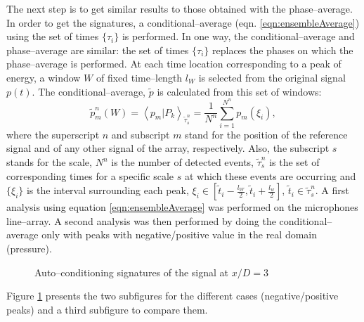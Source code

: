 The next step is to get similar results to those obtained with the phase--average. In order to get the signatures, a conditional--average (eqn. \ref{eqn:ensembleAverage}) using the set of times $\{\tau_{i}\}$ is performed. In one way, the conditional--average and phase--average are similar: the set of times $\{\tau_{i}\}$ replaces the phases on which the phase--average is performed. At each time location corresponding to a peak of energy, a window $W$ of fixed time--length $l_{W}$ is selected from the original signal $p \left( t \right)$. The conditional--average, $\tilde{p}$ is calculated from this set of windows:
\begin{equation} \label{eqn:ensembleAverage}
    \tilde{p}^n_{m}\left( W \right) = \left< p_{m} | P_{k} \right>_{\tilde{\tau}^n_{s}} = \frac{1}{N^n} \sum^{N^n}_{i = 1} p_{m}\left(\xi_{i}\right),
\end{equation}
where the superscript $n$ and subscript $m$ stand for the position of the reference signal and of any other signal of the array, respectively. Also, the subscript $s$ stands for the scale, $N^n$ is the number of detected events, $\tilde{\tau}^n_{s}$ is the set of corresponding times for a specific scale $s$ at which these events are occurring and $\{\xi_{i}\}$ is the interval surrounding each peak, $\xi_{i} \in \left[ \tilde{t}_{i} - \frac{l_W}{2}, \tilde{t}_{i} + \frac{l_w}{2} \right]$, $\tilde{t}_{i} \in \tilde{\tau}^n_{s}$.
A first analysis using equation \ref{eqn:ensembleAverage} was performed on the microphones line--array. A second analysis was then performed by doing the conditional--average only with peaks with negative/positive value in the real domain (pressure).
\begin{figure}
\centering{}

\caption{Auto--conditioning signatures of the signal at $x/D = 3$} \label{fig:compPeaks}
\end{figure}
Figure \ref{fig:compPeaks} presents the two subfigures for the different cases (negative/positive peaks) and a third subfigure to compare them.
